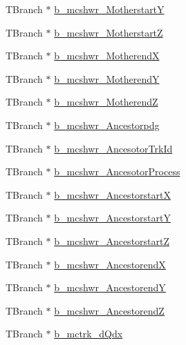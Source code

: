 \begin{DoxyCompactItemize}
\item 
T\-Branch $\ast$ \hyperlink{classanatree_a24ef95abc18682df76672770aab7e019}{b\-\_\-mcshwr\-\_\-\-Motherstart\-Y}
\item 
T\-Branch $\ast$ \hyperlink{classanatree_a07c1fc9caec1bd140ebfff47934e3c64}{b\-\_\-mcshwr\-\_\-\-Motherstart\-Z}
\item 
T\-Branch $\ast$ \hyperlink{classanatree_abe63eb085994efceda3af3ee5303ea51}{b\-\_\-mcshwr\-\_\-\-Motherend\-X}
\item 
T\-Branch $\ast$ \hyperlink{classanatree_af33fedfde6a0c48a3c88177ded8440bf}{b\-\_\-mcshwr\-\_\-\-Motherend\-Y}
\item 
T\-Branch $\ast$ \hyperlink{classanatree_ae1fa7ae0a5b57c4f995847057aeae762}{b\-\_\-mcshwr\-\_\-\-Motherend\-Z}
\item 
T\-Branch $\ast$ \hyperlink{classanatree_a2f4830eef4ad053d47da0e99f5bbeed8}{b\-\_\-mcshwr\-\_\-\-Ancestorpdg}
\item 
T\-Branch $\ast$ \hyperlink{classanatree_af10d2d609e4af74c8a9a70c53214ff3a}{b\-\_\-mcshwr\-\_\-\-Ancesotor\-Trk\-Id}
\item 
T\-Branch $\ast$ \hyperlink{classanatree_a2099cdf3b3e0a3fd61a60157ffa4c77f}{b\-\_\-mcshwr\-\_\-\-Ancesotor\-Process}
\item 
T\-Branch $\ast$ \hyperlink{classanatree_ada38024dd76ebd90010a236a77271844}{b\-\_\-mcshwr\-\_\-\-Ancestorstart\-X}
\item 
T\-Branch $\ast$ \hyperlink{classanatree_adcf3c50dba83b8bd22101ff84c4d5274}{b\-\_\-mcshwr\-\_\-\-Ancestorstart\-Y}
\item 
T\-Branch $\ast$ \hyperlink{classanatree_a7d646766ed5e4ee30aa9caa6d3336cc6}{b\-\_\-mcshwr\-\_\-\-Ancestorstart\-Z}
\item 
T\-Branch $\ast$ \hyperlink{classanatree_a1d31600d4084dbc6a2a98519518a3cc4}{b\-\_\-mcshwr\-\_\-\-Ancestorend\-X}
\item 
T\-Branch $\ast$ \hyperlink{classanatree_ae78dc647d234f376ec16593a948eaf40}{b\-\_\-mcshwr\-\_\-\-Ancestorend\-Y}
\item 
T\-Branch $\ast$ \hyperlink{classanatree_a0c83dd3cca1e34639d9f05af1eb2dd2e}{b\-\_\-mcshwr\-\_\-\-Ancestorend\-Z}
\item 
T\-Branch $\ast$ \hyperlink{classanatree_a5fc48efcb2861f419fe6928b5a6a7064}{b\-\_\-mctrk\-\_\-d\-Qdx}
\end{DoxyCompactItemize}


